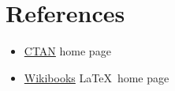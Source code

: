 \documentclass[12pt]{report}
\begin{document}
\section{References}
\label{sec:refs}
\begin{itemize}
\item \href{http://www.ctan.org}{CTAN} home page
\item \href{http://en.wikibooks.org/wiki/LaTeX/}{Wikibooks} \LaTeX\ home page
\end{itemize}


%
%
\clearpage {} %
\renewcommand\baselinestretch{1.5}


%
\begin{appendices}


\end{appendices}
%
%
%
\end{document}

